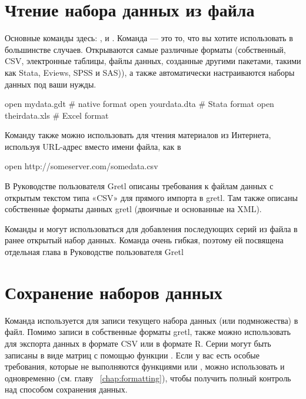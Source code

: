 \section{Чтение набора данных из файла}

Основные команды здесь: ,  и . Команда
 --- это то, что вы хотите использовать в большинстве
случаев. Открываются самые различные форматы (собственный, CSV,
электронные таблицы, файлы данных, созданные другими пакетами, такими
как \textsf{Stata}, \textsf{Eviews}, \textsf{SPSS} и \textsf{SAS})), а
также автоматически настраиваются наборы данных под ваши нужды.

\begin{code}
  open mydata.gdt    # native format
  open yourdata.dta  # Stata format
  open theirdata.xls # Excel format
\end{code}

Команду  также можно использовать для чтения материалов из
Интернета, используя URL-адрес вместо имени файла, как в
\begin{code}
  open http://someserver.com/somedata.csv
\end{code}

В Руководстве пользователя Gretl описаны требования к файлам данных с
открытым текстом типа «CSV» для прямого импорта в gretl. Там также
описаны собственные форматы данных gretl (двоичные и основанные на
XML).

Команды  и  могут использоваться для добавления
последующих серий из файла в ранее открытый набор данных. Команда
 очень гибкая, поэтому ей посвящена отдельная глава в
Руководстве пользователя Gretl

\section{Сохранение наборов данных}

Команда  используется для записи текущего набора данных
(или подмножества) в файл. Помимо записи в собственные форматы gretl,
 также можно использовать для экспорта данных в формате CSV
или в формате \textsf{R}. Серии могут быть записаны в виде матриц с
помощью функции . Если у вас есть особые требования,
которые не выполняются функциями  или , можно
использовать  и  одновременно (см. главу
~\ref{chap:formatting}), чтобы получить полный контроль над способом
сохранения данных.

